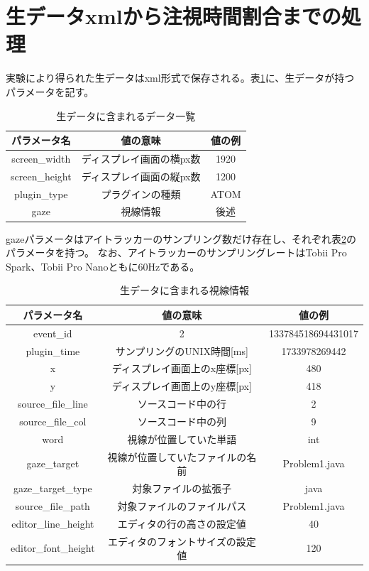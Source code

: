 \documentclass[paper=a4paper,fontsize=11pt]{jlreq}
\begin{document}
  \section{生データxmlから注視時間割合までの処理}
  実験により得られた生データはxml形式で保存される。表\ref{n_data}に、生データが持つパラメータを記す。
    \begin{table}[h]
      \centering
      \caption{生データに含まれるデータ一覧}
      \begin{tabular}{|c|c|c|}
        \hline
        パラメータ名 & 値の意味 & 値の例 \\ \hline
        screen\_width & ディスプレイ画面の横px数 & 1920 \\ \hline
        screen\_height & ディスプレイ画面の縦px数 & 1200 \\ \hline
        plugin\_type & プラグインの種類 & ATOM \\ \hline
        gaze & 視線情報 & 後述 \\ \hline
      \end{tabular}
      \label{n_data}
    \end{table}
   \FloatBarrier

  gazeパラメータはアイトラッカーのサンプリング数だけ存在し、それぞれ表\ref{gaze_data}のパラメータを持つ。
  なお、アイトラッカーのサンプリングレートはTobii Pro Spark、Tobii Pro Nanoともに60Hzである。

  \begin{table}[h]
    \centering
    \caption{生データに含まれる視線情報}
    \begin{tabular}{|c|c|c|}
        \hline
        パラメータ名 & 値の意味 & 値の例 \\ \hline
        event\_id & 2 & 133784518694431017 \\ \hline
        plugin\_time & サンプリングのUNIX時間[ms] & 1733978269442 \\ \hline
        x & ディスプレイ画面上のx座標[px] & 480 \\ \hline
        y & ディスプレイ画面上のy座標[px] & 418 \\ \hline
        source\_file\_line & ソースコード中の行 & 2 \\ \hline
        source\_file\_col & ソースコード中の列 & 9 \\ \hline
        word & 視線が位置していた単語 & int \\ \hline
        gaze\_target & 視線が位置していたファイルの名前 & Problem1.java \\ \hline
        gaze\_target\_type & 対象ファイルの拡張子 & java \\ \hline
        source\_file\_path & 対象ファイルのファイルパス & Problem1.java \\ \hline
        editor\_line\_height & エディタの行の高さの設定値 & 40 \\ \hline
        editor\_font\_height & エディタのフォントサイズの設定値 & 120 \\ \hline
    \end{tabular}
    \label{gaze_data}
  \end{table}
  \FloatBarrier
  
\end{document}

